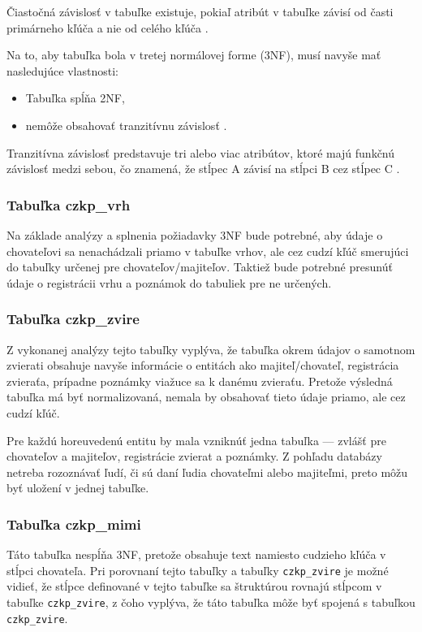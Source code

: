 Čiastočná závislosť v tabuľke existuje, pokiaľ atribút v tabuľke závisí od časti primárneho kľúča a nie od celého kľúča \cite{ciastocna-zavislost}. 

\pagebreak

Na to, aby tabuľka bola v tretej normálovej forme (3NF), musí navyše mať nasledujúce vlastnosti:
\begin{itemize}
	\item Tabuľka spĺňa 2NF,
	\item nemôže obsahovať tranzitívnu závislosť \cite{typy-normalizacie}.
\end{itemize}

Tranzitívna závislosť predstavuje tri alebo viac atribútov, ktoré majú funkčnú závislosť medzi sebou, čo znamená, že stĺpec A závisí na stĺpci B cez stĺpec C \cite{tranzitivna-zavislost}.

\subsubsection{Tabuľka czkp\_vrh}
Na základe analýzy a splnenia požiadavky 3NF bude potrebné, aby údaje o chovateľovi sa nenachádzali priamo v tabuľke vrhov, ale cez cudzí kľúč smerujúci do tabuľky určenej pre chovateľov/majiteľov.
Taktiež bude potrebné presunúť údaje o registrácii vrhu a poznámok do tabuliek pre ne určených.

\subsubsection{Tabuľka czkp\_zvire}
Z vykonanej analýzy tejto tabuľky vyplýva, že tabuľka okrem údajov o samotnom zvierati obsahuje navyše informácie o entitách ako majiteľ/chovateľ, registrácia zvieraťa, prípadne poznámky viažuce sa k danému zvieraťu. Pretože výsledná tabuľka má byť normalizovaná, nemala by obsahovať tieto údaje priamo, ale cez cudzí kľúč.

Pre každú horeuvedenú entitu by mala vzniknúť jedna tabuľka --- zvlášť pre chovateľov a majiteľov, registrácie zvierat a poznámky. Z pohľadu databázy netreba rozoznávať ľudí, či sú daní ľudia chovateľmi alebo majiteľmi, preto môžu byť uložení v jednej tabuľke.

\subsubsection{Tabuľka czkp\_mimi}
Táto tabuľka nespĺňa 3NF, pretože obsahuje text namiesto cudzieho kľúča v stĺpci chovateľa.
Pri porovnaní tejto tabuľky a tabuľky \texttt{czkp_zvire} je možné vidieť, že stĺpce definované v tejto tabuľke sa štruktúrou rovnajú stĺpcom v tabuľke \texttt{czkp_zvire}, z čoho vyplýva, že táto tabuľka môže byť spojená s tabuľkou \texttt{czkp_zvire}.

